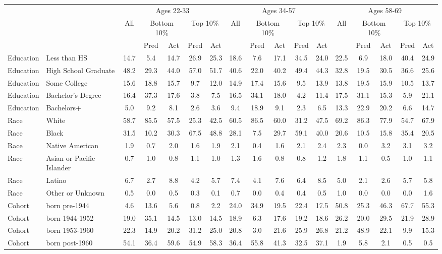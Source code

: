 \begin{tabular}{llccccc|ccccc|ccccc}
\hline\hline
 & & \multicolumn{5}{c|}{Ages 22-33} & \multicolumn{5}{c|}{Ages 34-57} & \multicolumn{5}{c}{Ages 58-69} \\
 & & All & \multicolumn{2}{c}{Bottom 10\%} & \multicolumn{2}{c|}{Top 10\%} & All & \multicolumn{2}{c}{Bottom 10\%} & \multicolumn{2}{c|}{Top 10\%} & All & \multicolumn{2}{c}{Bottom 10\%} & \multicolumn{2}{c}{Top 10\%} \\
 & & & Pred & Act & Pred & Act & & Pred & Act & Pred & Act & & Pred & Act & Pred & Act \\
\hline
Education&Less than HS&14.7&5.4&14.7&26.9&25.3&18.6&7.6&17.1&34.5&24.0&22.5&6.9&18.0&40.4&24.9\\
Education&High School Graduate&48.2&29.3&44.0&57.0&51.7&40.6&22.0&40.2&49.4&44.3&32.8&19.5&30.5&36.6&25.6\\
Education&Some College&15.6&18.8&15.7&9.7&12.0&14.9&17.4&15.6&9.5&13.9&13.8&19.5&15.9&10.5&13.7\\
Education&Bachelor's Degree&16.4&37.3&17.6&3.8&7.5&16.5&34.1&18.0&4.2&11.4&17.5&31.1&15.3&5.9&21.1\\
Education&Bachelors+&5.0&9.2&8.1&2.6&3.6&9.4&18.9&9.1&2.3&6.5&13.3&22.9&20.2&6.6&14.7\\
Race&White&58.7&85.5&57.5&25.3&42.5&60.5&86.5&60.0&31.2&47.5&69.2&86.3&77.9&54.7&67.9\\
Race&Black&31.5&10.2&30.3&67.5&48.8&28.1&7.5&29.7&59.1&40.0&20.6&10.5&15.8&35.4&20.5\\
Race&Native American&1.9&0.7&2.0&1.6&1.9&2.1&0.4&1.6&2.1&2.4&2.3&0.0&3.2&3.1&3.2\\
Race&Asian or Pacific Islander&0.7&1.0&0.8&1.1&1.0&1.3&1.6&0.8&0.8&1.2&1.8&1.1&0.5&1.0&1.1\\
Race&Latino&6.7&2.7&8.8&4.2&5.7&7.4&4.1&7.6&6.4&8.5&5.0&2.1&2.6&5.7&5.8\\
Race&Other or Unknown&0.5&0.0&0.5&0.3&0.1&0.7&0.0&0.4&0.4&0.5&1.0&0.0&0.0&0.0&1.6\\
Cohort&born pre-1944&4.6&13.6&5.6&0.8&2.2&24.0&34.9&19.5&22.4&17.5&50.8&25.3&46.3&67.7&55.3\\
Cohort&born 1944-1952&19.0&35.1&14.5&13.0&14.5&18.9&6.3&17.6&19.2&18.6&26.2&20.0&29.5&21.9&28.9\\
Cohort&born 1953-1960&22.3&14.9&20.2&31.2&25.0&20.8&3.0&21.6&25.9&26.8&21.2&48.9&22.1&9.9&15.3\\
Cohort&born post-1960&54.1&36.4&59.6&54.9&58.3&36.4&55.8&41.3&32.5&37.1&1.9&5.8&2.1&0.5&0.5\\

\end{tabular}
